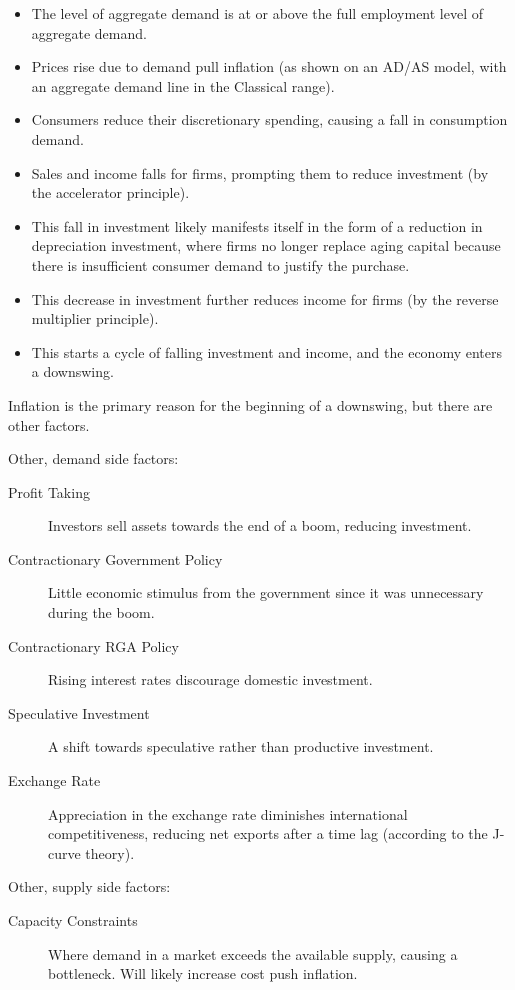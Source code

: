 \documentclass[a4paper,11pt]{article}
\begin{document}
\begin{itemize}
\item The level of aggregate demand is at or above the full employment level of
	aggregate demand.
\item Prices rise due to demand pull inflation (as shown on an AD/AS model, with
	an aggregate demand line in the Classical range).
\item Consumers reduce their discretionary spending, causing a fall in
	consumption demand.
\item Sales and income falls for firms, prompting them to reduce investment (by
	the accelerator principle).
\item This fall in investment likely manifests itself in the form of a reduction
	in depreciation investment, where firms no longer replace aging capital
	because there is insufficient consumer demand to justify the purchase.
\item This decrease in investment further reduces income for firms (by the
	reverse multiplier principle).
\item This starts a cycle of falling investment and income, and the economy
	enters a downswing.
\end{itemize}

Inflation is the primary reason for the beginning of a downswing, but there are
other factors.

Other, demand side factors:

\begin{description}
\item [Profit Taking] Investors sell assets towards the end of a boom, reducing
	investment.
\item [Contractionary Government Policy] Little economic stimulus from the
	government since it was unnecessary during the boom.
\item [Contractionary RGA Policy] Rising interest rates discourage domestic
	investment.
\item [Speculative Investment] A shift towards speculative rather than
	productive investment.
\item [Exchange Rate] Appreciation in the exchange rate diminishes international
	competitiveness, reducing net exports after a time lag (according to the
	J-curve theory).
\end{description}

Other, supply side factors:

\begin{description}
\item [Capacity Constraints] Where demand in a market exceeds the available
	supply, causing a bottleneck. Will likely increase cost push inflation.
\end{description}
\end{document}
